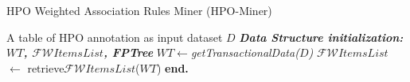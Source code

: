 \documentclass{article}
\theoremstyle{definition}
\begin{document}
\begin{algorithm}
\caption{HPO Weighted Association Rules Miner (HPO-Miner)}\label{alg:mapping}
\label{alg:mapping}
\begin{algorithmic}[1]
   \small \REQUIRE A table of HPO annotation as input dataset $D$
    \STATE \textbf{\textit{Data Structure initialization: $WT$, $\mathcal{FW}ItemsList$, \textit{FPTree}}}
    \medskip
    \STATE $WT \leftarrow $\textit{getTransactionalData($D$)}
    \medskip
	\STATE $\mathcal{FW}ItemsList$ $\leftarrow$ retrieve$\mathcal{FW}ItemsList$($WT$)
   \medskip
        \medskip
       \medskip
       \STATE \textbf{end.}

\end{algorithmic}
\end{algorithm}






%
\end{document}
